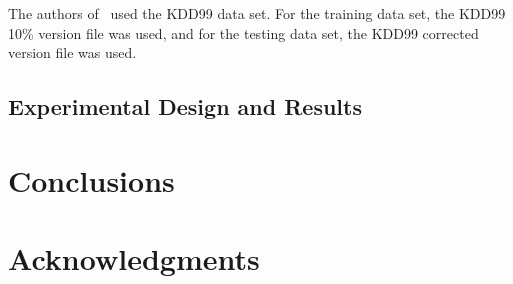 \documentclass{sig-alternate}
\begin{document}
The authors of~\cite{DBLP:journals/corr/abs-1204-1336} used the KDD99 data set. For the training data set, the KDD99 10\% version file was used, and for the testing data set, the KDD99 corrected version file was used. 




\subsection{Experimental Design and Results}





\section{Conclusions}





\section{Acknowledgments}





  
\end{document}
